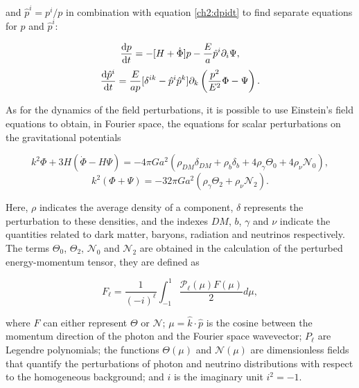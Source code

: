 \documentclass[openany,a4paper,12pt,oneside]{book}
\begin{document}
\begin{spacing}{1.5}
\noindent and $\hat{p}^i=p^i/p$ in combination with equation \eqref{ch2:dpidt} to find separate equations for $p$ and $\hat{p}^i$:

\begin{equation}\label{ch2:dpdt}
    \dv{p}{t}=-[H+\dot{\Phi}]p-\frac{E}{a}\hat{p}^i\partial_i\Psi,
\end{equation}
\begin{equation}\label{ch2:dp_hati_dt}
    \dv{\hat{p}^i}{t}=\frac{E}{ap}[\delta^{ik}-\hat{p}^i\hat{p}^k]\partial_k\left(\frac{p^2}{E^2}\Phi-\Psi\right).
\end{equation}

As for the dynamics of the field perturbations, it is possible to use Einstein's field equations to obtain, in Fourier space, the equations for scalar perturbations on the gravitational potentials\cite{dodelson2020modern}

\begin{equation}\label{ch2:first_dynamic_equation}
    k^2\Phi+3H(\dot{\Phi}-H\Psi)=-4\pi Ga^2(\rho_{DM}\delta_{DM}+\rho_b\delta_b+4\rho_\gamma \Theta_0+4\rho_\nu \mathcal{N}_0),
\end{equation}
\begin{equation}\label{ch2:second_dynamic_equation}
    k^2(\Phi+\Psi)=-32\pi Ga^2(\rho_\gamma \Theta_2+\rho_\nu \mathcal{N}_2).
\end{equation}

Here, $\rho$ indicates the average density of a component, $\delta$ represents the perturbation to these densities, and the indexes $DM$, $b$, $\gamma$ and $\nu$ indicate the quantities related to dark matter, baryons, radiation and neutrinos respectively. The terms $\Theta_0$, $\Theta_2$, $\mathcal{N}_0$ and $\mathcal{N}_2$ are obtained in the calculation of the perturbed energy-momentum tensor, they are defined as

\begin{equation}\label{ch2:Fl}
    F_\ell=\frac{1}{(-i)^\ell}\int_{-1}^1 \frac{\mathcal{P}_\ell(\mu)F(\mu)}{2}d\mu,
\end{equation}

\noindent where $F$ can either represent $\Theta$ or $\mathcal{N}$; $\mu=\hat{k}\cdot \hat{p}$ is the cosine between the momentum direction of the photon and the Fourier space wavevector; $P_\ell$ are Legendre polynomials; the functions $\Theta(\mu)$ and $\mathcal{N}(\mu)$ are dimensionless fields that quantify the perturbations of photon and neutrino distributions with respect to the homogeneous background; and $i$ is the imaginary unit $i^2=-1$. 


\end{spacing}
\end{document}
